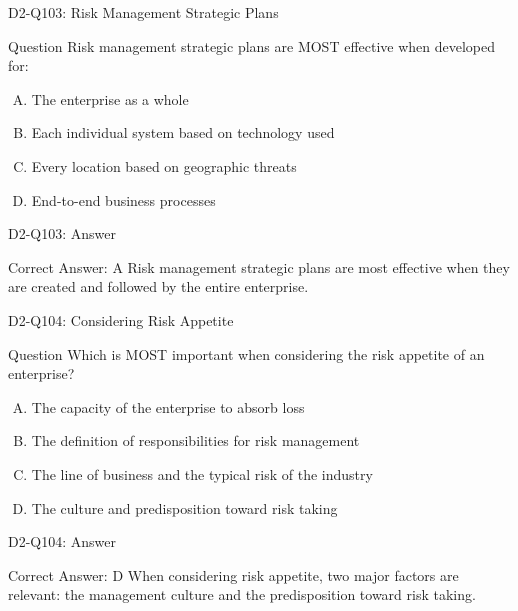 \documentclass{beamer}
\begin{document}
	\begin{frame}{D2-Q103: Risk Management Strategic Plans}
		\begin{block}{Question}
			Risk management strategic plans are MOST effective when developed for:
		\end{block}
		\begin{enumerate}[(A)]
			\item The enterprise as a whole
			\item Each individual system based on technology used
			\item Every location based on geographic threats
			\item End-to-end business processes
		\end{enumerate}
	\end{frame}
	\begin{frame}{D2-Q103: Answer}
		\begin{block}{Correct Answer: A}
			Risk management strategic plans are most effective when they are created and followed by the entire enterprise.
		\end{block}
	\end{frame}
	
	\begin{frame}{D2-Q104: Considering Risk Appetite}
		\begin{block}{Question}
			Which is MOST important when considering the risk appetite of an enterprise?
		\end{block}
		\begin{enumerate}[(A)]
			\item The capacity of the enterprise to absorb loss
			\item The definition of responsibilities for risk management
			\item The line of business and the typical risk of the industry
			\item The culture and predisposition toward risk taking
		\end{enumerate}
	\end{frame}
	\begin{frame}{D2-Q104: Answer}
		\begin{block}{Correct Answer: D}
			When considering risk appetite, two major factors are relevant: the management culture and the predisposition toward risk taking.
		\end{block}
	\end{frame}
	
\end{document}
